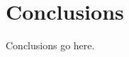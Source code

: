 \documentclass[../main.tex]{subfiles}
\begin{document}
\section{Conclusions}


Conclusions go here.
\end{document}
